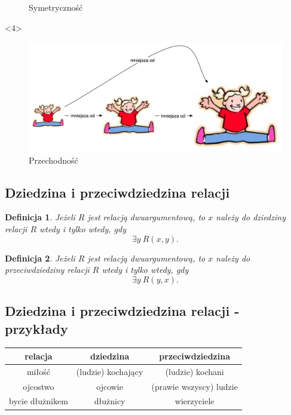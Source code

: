 \documentclass[12pt]{article}
\newtheorem{definicja}{Definicja}
\begin{document}
\begin{center}
{\begin{figure}
\caption{Symetryczność}
\end{figure}
}
<4>{
\begin{figure}
\includegraphics[scale=0.45]{../pliki_wlasne/przechodnia.jpg}
\caption{Przechodność}
\end{figure}
}
\end{center}
%



\subsection{Dziedzina i przeciwdziedzina relacji}
%
\begin{definicja}
Jeżeli $R$ jest relacją dwuargumentową, to $x$ należy do \emph{dziedziny} relacji $R$ wtedy i tylko wtedy, gdy $$\exists y~ R(x, y).$$
\end{definicja}
%
\begin{definicja}
Jeżeli $R$ jest relacją dwuargumentową, to $x$ należy do \emph{przeciwdziedziny} relacji $R$ wtedy i tylko wtedy, gdy $$\exists y~ R(y, x).$$
\end{definicja}
%

\subsection{Dziedzina i przeciwdziedzina relacji - przykłady}
%
\begin{center}
\begin{table}
{\small
\begin{tabular}{|c|c|c|}
\hline
\textbf{relacja} & \textbf{dziedzina} & \textbf{przeciwdziedzina} \\
\hline
miłość & (ludzie) kochający & (ludzie) kochani\\
\hline
ojcostwo & ojcowie & (prawie wszyscy) ludzie \\
\hline
bycie dłużnikem & dłużnicy & wierzyciele \\
\hline
\end{tabular}
}
\end{table}
\end{center}
%
\end{document}

